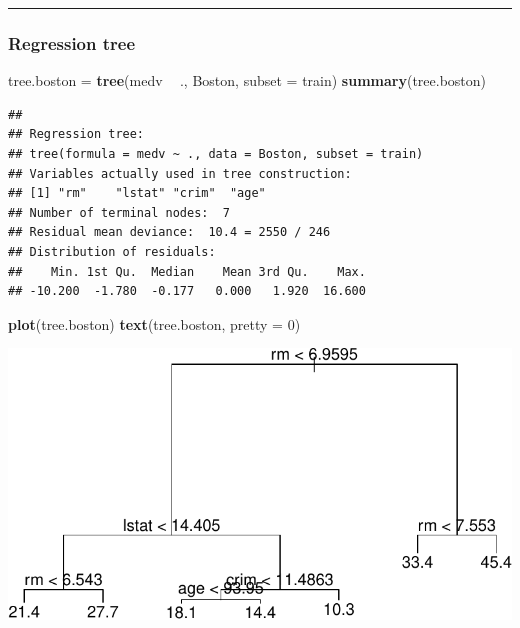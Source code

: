 \documentclass[]{article}
\newenvironment{Shaded}{\begin{snugshade}}{\end{snugshade}}
\newcommand{\DataTypeTok}[1]{\textcolor[rgb]{0.13,0.29,0.53}{#1}}
\newcommand{\DecValTok}[1]{\textcolor[rgb]{0.00,0.00,0.81}{#1}}
\newcommand{\KeywordTok}[1]{\textcolor[rgb]{0.13,0.29,0.53}{\textbf{#1}}}
\newcommand{\NormalTok}[1]{#1}
\newcommand{\OperatorTok}[1]{\textcolor[rgb]{0.81,0.36,0.00}{\textbf{#1}}}
\newcommand{\StringTok}[1]{\textcolor[rgb]{0.31,0.60,0.02}{#1}}
\begin{document}
\begin{center}\rule{0.5\linewidth}{\linethickness}\end{center}

\hypertarget{regression-tree}{%
\subsubsection{Regression tree}\label{regression-tree}}

\begin{Shaded}
\begin{Highlighting}[]
\NormalTok{tree.boston =}\StringTok{ }\KeywordTok{tree}\NormalTok{(medv }\OperatorTok{~}\StringTok{ }\NormalTok{., Boston, }\DataTypeTok{subset =}\NormalTok{ train)}
\KeywordTok{summary}\NormalTok{(tree.boston)}
\end{Highlighting}
\end{Shaded}

\begin{verbatim}
## 
## Regression tree:
## tree(formula = medv ~ ., data = Boston, subset = train)
## Variables actually used in tree construction:
## [1] "rm"    "lstat" "crim"  "age"  
## Number of terminal nodes:  7 
## Residual mean deviance:  10.4 = 2550 / 246 
## Distribution of residuals:
##    Min. 1st Qu.  Median    Mean 3rd Qu.    Max. 
## -10.200  -1.780  -0.177   0.000   1.920  16.600
\end{verbatim}

\begin{Shaded}
\begin{Highlighting}[]
\KeywordTok{plot}\NormalTok{(tree.boston)}
\KeywordTok{text}\NormalTok{(tree.boston, }\DataTypeTok{pretty =} \DecValTok{0}\NormalTok{)}
\end{Highlighting}
\end{Shaded}

\includegraphics{8Trees_files/figure-latex/unnamed-chunk-39-1.pdf}
\end{document}
